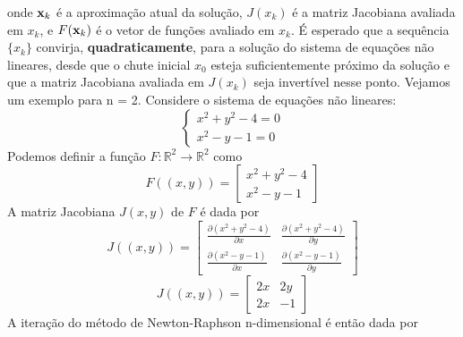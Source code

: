 onde \(\textbf{x}_k\) é a aproximação atual da solução, \(J(x_k)\) é a matriz Jacobiana avaliada em \(x_k\), e \(F(\textbf{x}_k)\) é o vetor de funções avaliado em \(x_k\). É esperado que a sequência \(\{x_k\}\) convirja, \textbf{quadraticamente}, para a solução do sistema de equações não lineares, desde que o chute inicial \(x_0\) esteja suficientemente próximo da solução e que a matriz Jacobiana avaliada em \(J(x_k)\) seja invertível nesse ponto.
Vejamos um exemplo para n = 2. Considere o sistema de equações não lineares:
\begin{equation*}
    \begin{cases}
    x^2 + y^2 - 4 = 0 \\
    x^2 - y - 1 = 0
    \end{cases}
\end{equation*}
Podemos definir a função \(F : \mathbb{R}^2 \rightarrow \mathbb{R}^2\) como
\begin{equation*}
    F((x, y)) = \begin{bmatrix}
                    x^2 + y^2 - 4 \\
                    x^2 - y - 1
                \end{bmatrix}
\end{equation*}
A matriz Jacobiana \(J(x, y)\) de \(F\) é dada por
\begin{equation*}
    J((x, y)) = \begin{bmatrix}
        \frac{\partial ( x^2 + y^2 - 4 )}{\partial x} & \frac{\partial ( x^2 + y^2 - 4 )}{\partial y} \\
        \frac{\partial ( x^2 - y - 1 )}{\partial x} & \frac{\partial ( x^2 - y - 1 )}{\partial y}
    \end{bmatrix}
\end{equation*}
\begin{equation*}
    J((x, y)) = \begin{bmatrix}
        2x & 2y \\
        2x & -1
    \end{bmatrix}
\end{equation*}
A iteração do método de Newton-Raphson n-dimensional é então dada por
